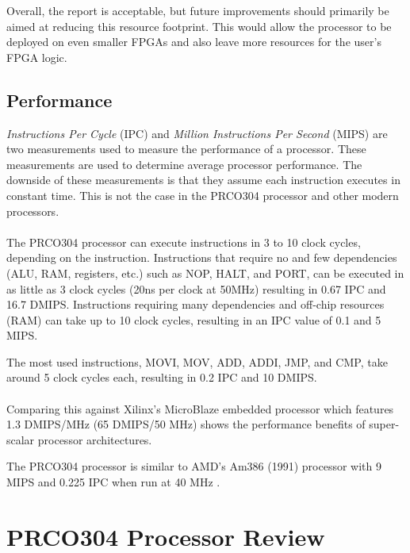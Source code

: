 \documentclass[11pt,a4paper]{report}
\newcommand{\scname}{PRCO304}
\begin{document}
Overall, the report is acceptable, but future improvements should primarily be aimed at reducing this resource footprint. This would allow the processor to be deployed on even smaller FPGAs and also leave more resources for the user's FPGA logic.

\subsection{Performance}
\textit{Instructions Per Cycle} (IPC) and \textit{Million Instructions Per Second} (MIPS) are two measurements used to measure the performance of a processor. These measurements are used to determine average processor performance. The downside of these measurements is that they assume each instruction executes in constant time. This is not the case in the \scname{} processor and other modern processors.
\\\\
The \scname{} processor can execute instructions in 3 to 10 clock cycles, depending on the instruction. Instructions that require no and few dependencies (ALU, RAM, registers, etc.) such as NOP, HALT, and PORT, can be executed in as little as 3 clock cycles (20ns per clock at 50MHz) resulting in 0.67 IPC and 16.7 DMIPS. Instructions requiring many dependencies and off-chip resources (RAM) can take up to 10 clock cycles, resulting in an IPC value of 0.1 and 5 MIPS.

The most used instructions, MOVI, MOV, ADD, ADDI, JMP, and CMP, take around 5 clock cycles each, resulting in 0.2 IPC and 10 DMIPS.
\\\\
Comparing this against Xilinx's MicroBlaze embedded processor which features 1.3 DMIPS/MHz (65 DMIPS/50 MHz) shows the performance benefits of super-scalar processor architectures. 

The \scname{} processor is similar to AMD's Am386 (1991) processor with 9 MIPS and 0.225 IPC when run at 40 MHz \cite{am386}.


\newpage
\section{\scname{} Processor Review}
\end{document}
